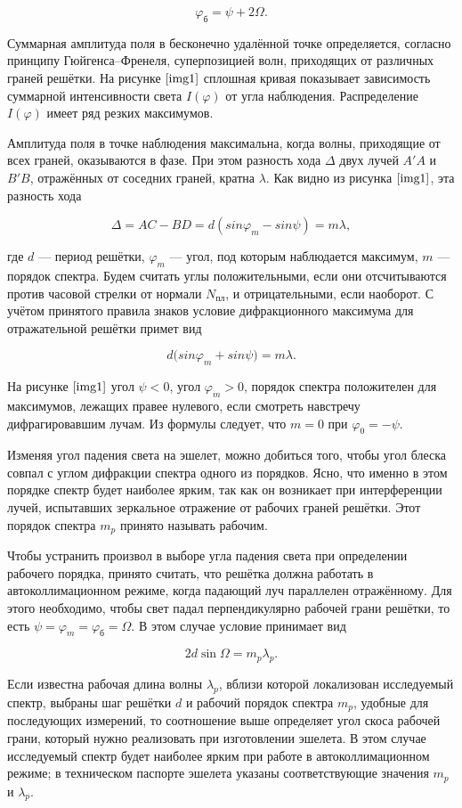 \documentclass[a4paper,12pt]{article} %
\begin{document}
\[ \varphi_{\text{б}}=\psi+2\Omega. \]

Суммарная амплитуда поля в бесконечно удалённой точке определяется, согласно принципу Гюйгенса–Френеля, суперпозицией волн, приходящих от различных граней решётки. На рисунке $\ref{img1}$ сплошная кривая показывает зависимость суммарной интенсивности света $I(\varphi)$ от угла наблюдения. Распределение $I(\varphi)$ имеет ряд резких максимумов.

Амплитуда поля в точке наблюдения максимальна, когда волны, приходящие от всех граней, оказываются в фазе. При этом разность хода $\Delta$ двух лучей $A'A$ и $B'B$, отражённых от соседних граней, кратна $\lambda$. Как видно из рисунка $\ref{img1}$, эта разность хода 

\[ \Delta=AC-BD=d(sin{\varphi_m}-sin{\psi})=m\lambda, \]

где $d$ — период решётки, $\varphi_m$ — угол, под которым наблюдается максимум, $m$ — порядок спектра. Будем считать углы положительными, если они отсчитываются против часовой стрелки от нормали $N_{\text{пл}}$, и отрицательными, если наоборот. С учётом принятого правила знаков условие дифракционного максимума для отражательной решётки примет вид

\[ d(sin{\varphi_m+sin{\psi})=m\lambda.} \]

На рисунке $\ref{img1}$ угол $\psi<0$, угол $\varphi_m>0$, порядок спектра положителен для максимумов, лежащих правее нулевого, если смотреть навстречу дифрагировавшим лучам. Из формулы следует, что $m=0$ при $\varphi_0 = -{\psi}$.

Изменяя угол падения света на эшелет, можно добиться того, чтобы угол блеска совпал с углом дифракции спектра одного из порядков. Ясно, что именно в этом порядке спектр будет наиболее ярким, так как он возникает при интерференции лучей, испытавших зеркальное отражение от рабочих граней решётки. Этот порядок спектра $m_p$ принято называть рабочим.

Чтобы устранить произвол в выборе угла падения света при определении рабочего порядка, принято считать, что решётка должна работать в автоколлимационном режиме, когда падающий луч параллелен отражённому. Для этого необходимо, чтобы свет падал перпендикулярно рабочей грани решётки, то есть $\psi=\varphi_m=\varphi_{\text{б}}=\Omega$. В этом случае условие принимает вид

\[ 2d\sin{\Omega}=m_p\lambda_p. \]

Если известна рабочая длина волны $\lambda_{p}$, вблизи которой локализован исследуемый спектр, выбраны шаг решётки $d$ и рабочий порядок спектра $m_{p}$, удобные для последующих измерений, то соотношение выше определяет угол скоса рабочей грани, который нужно реализовать при изготовлении эшелета. В этом случае исследуемый спектр будет наиболее ярким при работе в автоколлимационном режиме; в техническом паспорте эшелета указаны соответствующие значения $m_{p}$ и $\lambda_{p}$.
\end{document}
